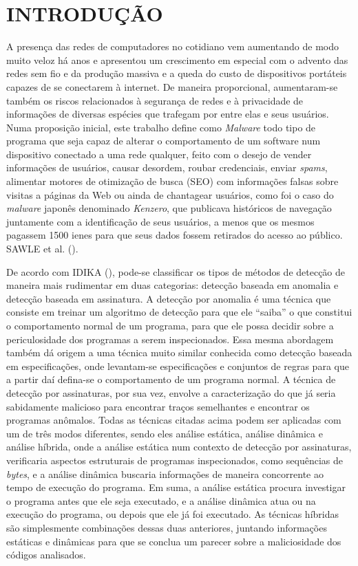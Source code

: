 \chapter{INTRODUÇÃO}
\label{c.introducao}

A presença das redes de computadores no cotidiano vem aumentando de modo muito
veloz há anos e apresentou um crescimento em especial com o advento das redes
sem fio e da produção massiva e a queda do custo de dispositivos portáteis
capazes de se conectarem à internet. De maneira proporcional, aumentaram-se
também os riscos relacionados à segurança de redes e à privacidade de
informações de diversas espécies que trafegam por entre elas e seus usuários.
Numa proposição inicial, este trabalho define como \textit{Malware} todo tipo de
programa que seja capaz de alterar o comportamento de um software num
dispositivo conectado a uma rede qualquer, feito com o desejo de vender
informações de usuários, causar desordem, roubar credenciais, enviar \textit{spams},
alimentar motores de otimização de busca (SEO) com informações falsas sobre
visitas a páginas da Web ou ainda de chantagear usuários, como foi o caso do
\textit{malware} japonês denominado \textit{Kenzero}, que publicava históricos de navegação
juntamente com a identificação de seus usuários, a menos que os mesmos
pagassem 1500 ienes para que seus dados fossem retirados do acesso ao público.
SAWLE et al. (\citeyear{sawle14}).

De acordo com IDIKA (\citeyear{idika07}), pode-se classificar os tipos de
métodos de detecção de maneira mais rudimentar em duas categorias: detecção
baseada em anomalia e detecção baseada em assinatura. A detecção por anomalia
é uma técnica que consiste em treinar um algoritmo de detecção para que ele
“saiba” o que constitui o comportamento normal de um programa, para que ele
possa decidir sobre a periculosidade dos programas a serem inspecionados. Essa
mesma abordagem também dá origem a uma técnica muito similar conhecida como
detecção baseada em especificações, onde levantam-se especificações e
conjuntos de regras para que a partir daí defina-se o comportamento de um
programa normal. A técnica de detecção por assinaturas, por sua vez, envolve a
caracterização do que já seria sabidamente malicioso para encontrar traços
semelhantes e encontrar os programas anômalos. Todas as técnicas citadas acima
podem ser aplicadas com um de três modos diferentes, sendo eles análise
estática, análise dinâmica e análise híbrida, onde a análise estática num
contexto de detecção por assinaturas, verificaria aspectos estruturais de
programas inspecionados, como sequências de \textit{bytes}, e a análise dinâmica
buscaria informações de maneira concorrente ao tempo de execução do programa.
Em suma, a análise estática procura investigar o programa antes que ele seja
executado, e a análise dinâmica atua ou na execução do programa, ou depois que
ele já foi executado. As técnicas híbridas são simplesmente combinações dessas
duas anteriores, juntando informações estáticas e dinâmicas para que se
conclua um parecer sobre a maliciosidade dos códigos analisados.

